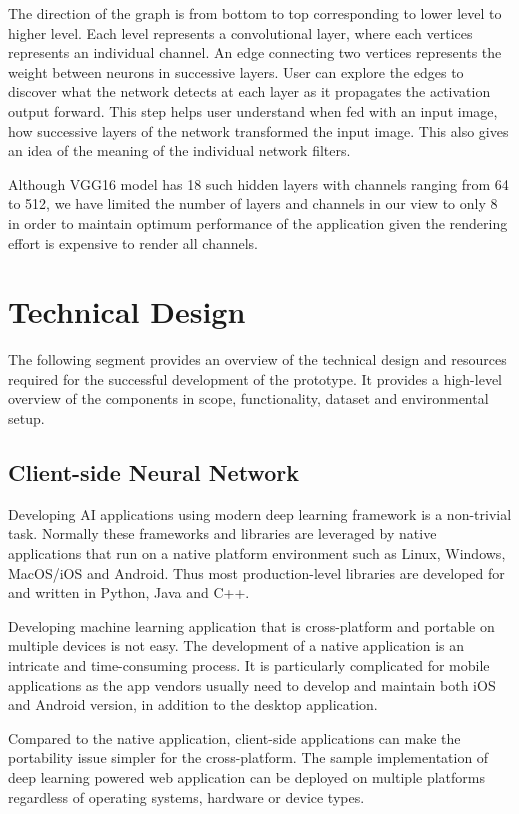 The direction of the graph is from bottom to top corresponding to lower level to higher level. Each level represents a convolutional layer, where each vertices represents an individual channel. An edge connecting two vertices represents the weight between neurons in successive layers. User can explore the edges to discover what the network detects at each layer as it propagates the activation output forward. This step helps user understand when fed with an input image, how successive layers of the network transformed the input image. This also gives an idea of the meaning of the individual network filters.

Although VGG16 model has 18 such hidden layers with channels ranging from 64 to 512, we have limited the number of layers and channels in our view to only 8 in order to maintain optimum performance of the application given the rendering effort is expensive to render all channels.

\section{Technical Design}
The following segment provides an overview of the technical design and resources required for the successful development of the prototype. It provides a high-level overview of the components in scope, functionality, dataset and environmental setup.

\subsection{Client-side Neural Network}
Developing AI applications using modern deep learning framework is a non-trivial task. Normally these frameworks and libraries are leveraged by native applications that run on a native platform environment such as Linux, Windows, MacOS/iOS and Android. Thus most production-level libraries are developed for and written in Python, Java and C++.

Developing machine learning application that is cross-platform and portable on multiple devices is not easy. The development of a native application is an intricate and time-consuming process. It is particularly complicated for mobile applications as the app vendors usually need to develop and maintain both iOS and Android version, in addition to the desktop application.

Compared to the native application, client-side applications can make the portability issue simpler for the cross-platform. The sample implementation of deep learning powered web application can be deployed on multiple platforms regardless of operating systems, hardware or device types.

